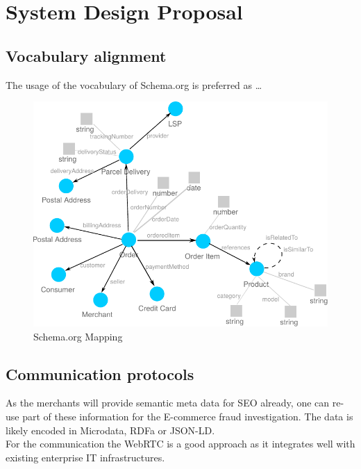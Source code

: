 
\section{System Design Proposal}
\label{sec:design_proposal}

\subsection{Vocabulary alignment}
\label{subsec:vocab_align}

The usage of the vocabulary of Schema.org is preferred as \ldots

\begin{figure}[H]
	\centering
		\includegraphics[width=0.8\columnwidth]{images/schema_org_mapping.pdf}
	\caption{Schema.org Mapping}
\label{fig:images_schema_org}
\end{figure}


\subsection{Communication protocols}
\label{subsec:comm_protocol}

As the merchants will provide semantic meta data for SEO already, one can re-use part of these information for the E-commerce fraud investigation. The data is likely encoded in Microdata, \gls{RDFa} or \gls{JSON-LD}. \\

For the communication the \gls{WebRTC} is a good approach as it integrates well with existing enterprise IT infrastructures.


